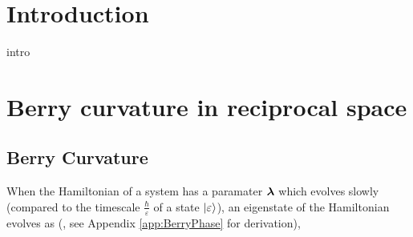 \documentclass{report}
\renewcommand\vec[1]{\ensuremath\boldsymbol{#1}} %
\begin{document}
\maketitle


\tableofcontents




\chapter{Introduction}
intro
\chapter{Berry curvature in reciprocal space}
\section{Berry Curvature}
When the Hamiltonian of a system has a paramater $\vec{\lambda}$ which evolves slowly (compared to the timescale $\frac{\hbar}{\varepsilon}$ of a state $\ket{\varepsilon}$), an eigenstate of the Hamiltonian evolves as (\cite{BerryQuantalPhase1984}, see Appendix \ref{app:BerryPhase} for derivation),
\end{document}
